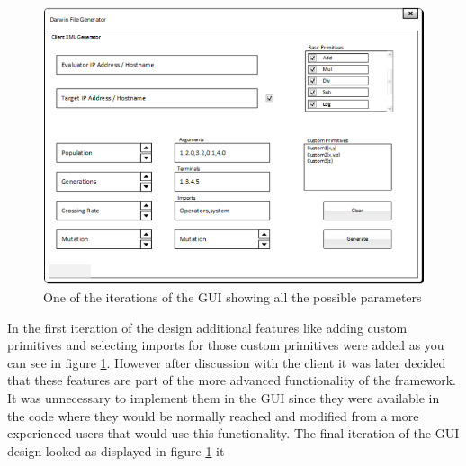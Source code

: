\begin{figure}[htp]
\centering
\includegraphics[scale=0.6]{Figures/guiit.png}
\caption{One of the iterations of the GUI showing all the possible parameters}
\label{fig:guiit}
\end{figure}

In the first iteration of the design additional features like adding custom primitives and selecting imports
for those custom primitives were added as you can see in figure \ref{fig:guiit}. However after discussion with the client it was later
decided that these features are part of the more advanced functionality of the framework. It was unnecessary to implement them in the GUI
 since they were available in the code where they would be 
normally reached and modified from a more experienced users that would use this functionality. The final iteration of the GUI design
 looked as displayed in figure \ref{fig:guiit}
 it